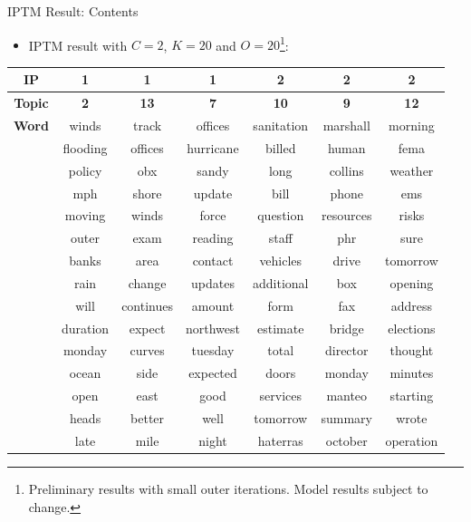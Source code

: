 \documentclass[10pt]{beamer}
\def\bni{\begin{itemize}} \def\ei{\end{itemize}}
\theoremstyle{definition}
\theoremstyle{remark}
\begin{document}
 \begin{frame}{IPTM Result: Contents}
 	\bni \item IPTM result with $C=2$, $K=20$ and $O= 20$\footnote{Preliminary results with small outer iterations. Model results subject to change.}:
 	\ei
 	\scriptsize
\centering	\begin{table}[ht]
	\centering
	\begin{tabular}{ |c||c|c|c||c|c|c|} 
		\hline
		\textbf{IP} & \textbf{1} &  \textbf{1} & \textbf{1}  &\textbf{2} &\textbf{2}  &\textbf{2}  \\ \hline\hline
			\textbf{Topic} & \textbf{2} &  \textbf{13} & \textbf{7}  &\textbf{10} &\textbf{9}  &\textbf{12}  \\ \hline\hline
			\textbf{Word}& winds & track & offices & sanitation & marshall & morning\\
			&flooding & offices & hurricane & billed & human & fema\\
			&policy & obx & sandy & long & collins & weather\\
			&mph & shore &  update & bill & phone & ems\\
			&moving & winds & force & question & resources & risks \\
			&outer & exam & reading & staff & phr & sure\\
			&banks & area &  contact & vehicles & drive & tomorrow\\
			&rain & change & updates & additional & box & opening\\
			&will & continues & amount & form & fax & address\\
			&duration & expect & northwest &  estimate & bridge &  elections\\
			&monday & curves & tuesday &  total & director & thought\\
			&ocean & side & expected & doors & monday & minutes \\
			&open & east & good & services & manteo & starting\\
			&heads & better &  well & tomorrow & summary & wrote\\
			&late & mile & night & haterras & october & operation\\
			
				\hline
	\end{tabular}
\end{table}
\normalsize
\end{frame}
\end{document}
